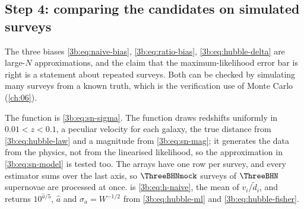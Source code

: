 \subsection{Step 4: comparing the candidates on simulated surveys}
\label{3b:sec:hubble-mc}

The three biases \eqref{3b:eq:naive-bias}, \eqref{3b:eq:ratio-bias},
\eqref{3b:eq:hubble-delta} are large-$N$ approximations, and the claim that
the maximum-likelihood error bar is right is a statement about repeated
surveys. Both can be checked by simulating many surveys from a known truth,
which is the verification use of Monte Carlo (\cref{ch:06}).

The function  is \eqref{3b:eq:sn-sigma}. The function
 draws redshifts uniformly in $0.01<z<0.1$, a peculiar
velocity for each galaxy, the true distance from \eqref{3b:eq:hubble-law}
and a magnitude from \eqref{3b:eq:sn-mag}; it generates the data from the
physics, not from the linearised likelihood, so the approximation in
\eqref{3b:eq:sn-model} is tested too. The arrays have one row per survey,
and every estimator sums over the last axis, so $\ThreeBHNmock$ surveys of
$\ThreeBHN$ supernovae are processed at once.  is
\eqref{3b:eq:h-naive},  the mean of $v_i/\tilde d_i$, and
 returns $10^{\hat a/5}$, $\hat a$ and $\sigma_a=W^{-1/2}$ from
\eqref{3b:eq:hubble-ml} and \eqref{3b:eq:hubble-fisher}.

